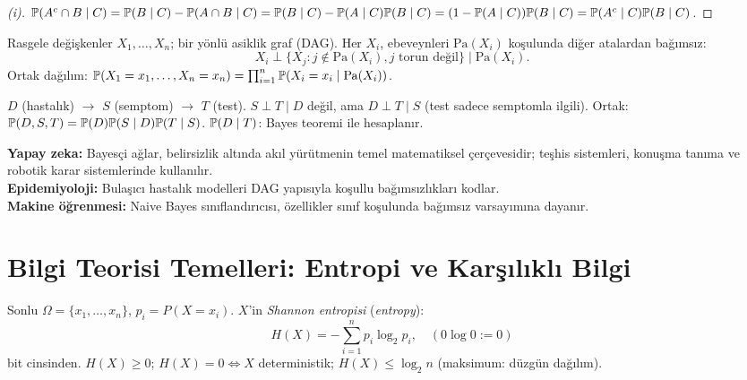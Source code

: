 \begin{proof}[(i)]
$\mathbb{P}(A^c \cap B \mid C) = \mathbb{P}(B \mid C) - \mathbb{P}(A \cap B \mid C)
= \mathbb{P}(B \mid C) - \mathbb{P}(A \mid C)\mathbb{P}(B \mid C) = (1-\mathbb{P}(A \mid C))\mathbb{P}(B \mid C)
= \mathbb{P}(A^c \mid C)\mathbb{P}(B \mid C)$.
\end{proof}

\begin{tanim}
\label{def:bayesci_ag}
Rasgele değişkenler $X_1, \ldots, X_n$; bir yönlü asiklik graf (DAG).
Her $X_i$, ebeveynleri $\mathrm{Pa}(X_i)$ koşulunda diğer atalardan bağımsız:
\[
  X_i \perp \{X_j : j \notin \mathrm{Pa}(X_i), j \text{ torun değil}\} \mid \mathrm{Pa}(X_i).
\]
Ortak dağılım: $\mathbb{P}(X_1 = x_1, \ldots, X_n = x_n) = \prod_{i=1}^n \mathbb{P}(X_i = x_i \mid \mathrm{Pa}(X_i))$.
\end{tanim}

\begin{ornek}
$D$ (hastalık) $\to$ $S$ (semptom) $\to$ $T$ (test).
$S \perp T \mid D$ değil, ama $D \perp T \mid S$ (test sadece semptomla ilgili).
Ortak: $\mathbb{P}(D, S, T) = \mathbb{P}(D)\mathbb{P}(S \mid D)\mathbb{P}(T \mid S)$.
$\mathbb{P}(D \mid T)$: Bayes teoremi ile hesaplanır.
\end{ornek}

\begin{disiplinlerarasibaglan}
\textbf{Yapay zeka:} Bayesçi ağlar, belirsizlik altında akıl yürütmenin
temel matematiksel çerçevesidir; teşhis sistemleri, konuşma tanıma ve robotik karar sistemlerinde kullanılır.\\
\textbf{Epidemiyoloji:} Bulaşıcı hastalık modelleri DAG yapısıyla koşullu bağımsızlıkları kodlar.\\
\textbf{Makine öğrenmesi:} Naive Bayes sınıflandırıcısı, özellikler sınıf koşulunda bağımsız varsayımına dayanır.
\end{disiplinlerarasibaglan}

\section{Bilgi Teorisi Temelleri: Entropi ve Karşılıklı Bilgi}
\label{sec:entropi}

\begin{tanim}\label{def:entropi}
Sonlu $\Omega=\{x_1,\ldots,x_n\}$, $p_i=P(X=x_i)$. $X$'in \emph{Shannon entropisi} (\emph{entropy}):
\[
  H(X) = -\sum_{i=1}^n p_i \log_2 p_i,\quad (0\log 0:=0)
\]
bit cinsinden. $H(X)\geq0$; $H(X)=0\iff X$ deterministik; $H(X)\leq\log_2 n$ (maksimum: düzgün dağılım).
\end{tanim}

